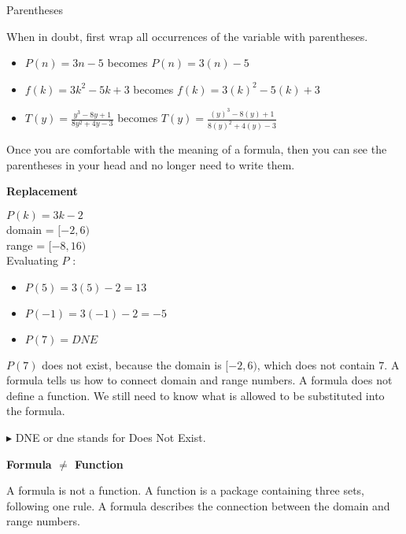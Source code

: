 \documentclass{ximera}
\begin{document}
\begin{example}   Parentheses 

When in doubt, first wrap all occurrences of the variable with parentheses.
\begin{itemize}
\item $P(n) = 3n - 5$ becomes $P(n) = 3(n) - 5$ \\

\item $f(k) = 3k^2 - 5k + 3$ becomes $f(k) = 3(k)^2 - 5(k) + 3$ \\

\item $T(y) = \frac{y^3 - 8y + 1}{8y^2 + 4y - 3}$ becomes $T(y) = \frac{(y)^3 - 8(y) + 1}{8(y)^2 + 4(y) - 3}$
\end{itemize}

\end{example}

Once you are comfortable with the meaning of a formula, then you can see the parentheses in your head and no longer need to write them.










  
\begin{procedure}   \textbf{\textcolor{purple!85!blue}{Replacement}}    

$P(k) = 3k - 2$ \\
domain = $[-2, 6)$ \\
range = $[-8, 16)$ \\

Evaluating $P$ :
\begin{itemize}
\item $P(5) = 3(5) - 2 = 13$
\item $P(-1) = 3(-1) - 2 = -5$
\item $P(7) = DNE$
\end{itemize}


$P(7)$ does not exist, because the domain is $[-2, 6)$, which does not contain $7$.  A formula tells us how to connect domain and range numbers.  A formula does not define a function.  We still need to know what is allowed to be substituted into the formula.

\end{procedure}
$\blacktriangleright$ DNE or dne stands for Does Not Exist. 



\begin{warning}  \textbf{\textcolor{red!90!darkgray}{Formula $\ne$ Function}}   

A formula is not a function.  A function is a package containing three sets, following one rule.  A formula describes the connection between the domain and range numbers.

\end{warning}
\end{document}
